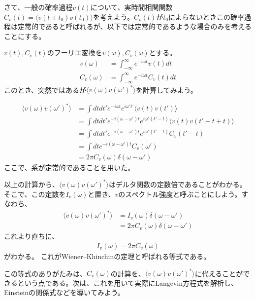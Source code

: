 \documentclass[uplatex,dvipdfmx]{jsarticle}
\begin{document}
さて、一般の確率過程$v(t)$について、実時間相関関数$C_v(t) = \langle v(t+t_0)v(t_0)\rangle$を考えよう。$C_v(t)$が$t_0$によらないときこの確率過程は定常的であると呼ばれるが、以下では定常的であるような場合のみを考えることにする。

$v(t), C_v(t)$のフーリエ変換を$v(\omega), C_v(\omega)$とする。
\begin{align}
    v(\omega) &= \int_{-\infty}^{\infty} e^{-i\omega t} v(t) dt \\ 
    C_v(\omega) &= \int_{-\infty}^{\infty} e^{-i\omega t} C_v(t) dt
\end{align}
このとき、突然ではあるが$\langle v(\omega)v(\omega')^*\rangle$を計算してみよう。

\begin{align}
    \langle v(\omega)v(\omega')^*\rangle &= \int dt dt' e^{-i\omega t} e^{i\omega' t'} \langle v(t) v(t')\rangle \\
        &= \int dt dt' e^{-i(\omega-\omega')t} e^{i\omega'(t'-t)} \langle v(t) v(t'-t +t)\rangle \\
        &= \int dt dt' e^{-i(\omega-\omega')t} e^{i\omega'(t'-t)} C_v(t'-t) \\
        &= \int dt e^{-i(\omega-\omega')t} C_v(\omega') \\
        &= 2\pi C_v(\omega) \delta(\omega-\omega')
\end{align}
ここで、系が定常的であることを用いた。

以上の計算から、$\langle v(\omega)v(\omega')^*\rangle$はデルタ関数の定数倍であることがわかる。
そこで、この定数を$I_v(\omega)$と置き、$v$のスペクトル強度と呼ぶことにしよう。すなわち、
\begin{align}
    \langle v(\omega)v(\omega')^*\rangle &= I_v(\omega) \delta(\omega-\omega') \\
        &= 2\pi C_v(\omega) \delta(\omega-\omega')
\end{align}
これより直ちに、
\begin{align}
    I_v(\omega) = 2\pi C_v(\omega) \label{eq:Wiener–Khinchin}
\end{align}
がわかる。
これがWiener–Khinchinの定理と呼ばれる等式である。

この等式のありがたみは、$C_v(\omega)$の計算を、$\langle v(\omega)v(\omega')^*\rangle$に代えることができるという点である。次は、これを用いて実際にLangevin方程式を解析し、Einsteinの関係式などを導いてみよう。
\end{document}
